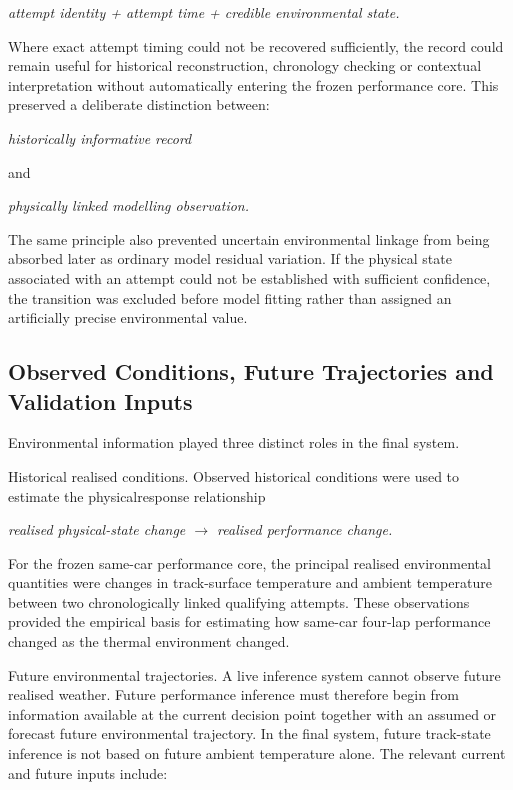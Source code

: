 \begin{center}\textit{attempt identity + attempt time + credible environmental state.}\end{center}

Where exact attempt timing could not be recovered sufficiently, the record could remain useful for historical reconstruction, chronology checking or contextual interpretation without automatically entering the frozen performance core. This preserved a deliberate distinction between:

\begin{center}\textit{historically informative record}\end{center}

and

\begin{center}\textit{physically linked modelling observation.}\end{center}

The same principle also prevented uncertain environmental linkage from being absorbed later as ordinary model residual variation. If the physical state associated with an attempt could not be established with sufficient confidence, the transition was excluded before model fitting rather than assigned an artificially precise environmental value.

\subsection{Observed Conditions, Future Trajectories and Validation Inputs}
Environmental information played three distinct roles in the final system.

Historical realised conditions. Observed historical conditions were used to estimate the physicalresponse relationship

\begin{center}\textit{realised physical-state change \ensuremath{\rightarrow} realised performance change.}\end{center}

For the frozen same-car performance core, the principal realised environmental quantities were changes in track-surface temperature and ambient temperature between two chronologically linked qualifying attempts. These observations provided the empirical basis for estimating how same-car four-lap performance changed as the thermal environment changed.

Future environmental trajectories. A live inference system cannot observe future realised weather. Future performance inference must therefore begin from information available at the current decision point together with an assumed or forecast future environmental trajectory. In the final system, future track-state inference is not based on future ambient temperature alone. The relevant current and future inputs include:


